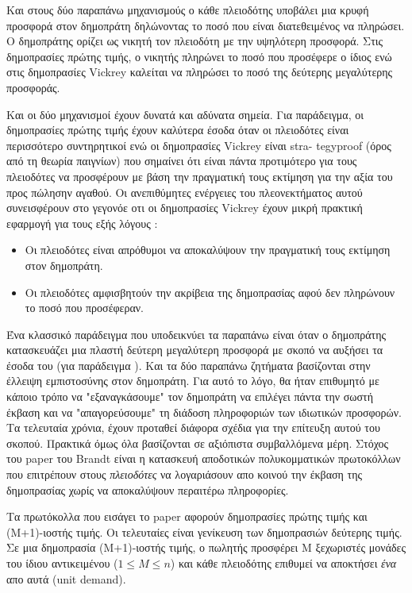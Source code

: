 \documentclass[a4paper,11pt]{article}
\begin{document}
Και στους δύο παραπάνω μηχανισμούς ο κάθε πλειοδότης υποβάλει μια κρυφή προσφορά στον δημοπράτη δηλώνοντας το
ποσό που είναι διατεθειμένος να πληρώσει. Ο δημοπράτης ορίζει ως νικητή τον πλειοδότη με την υψηλότερη
προσφορά. Στις δημοπρασίες πρώτης τιμής, ο νικητής πληρώνει το ποσό που προσέφερε ο ίδιος ενώ στις δημοπρασίες
Vickrey καλείται να πληρώσει το ποσό της δεύτερης μεγαλύτερης προσφοράς.

Και οι δύο μηχανισμοί έχουν δυνατά και αδύνατα σημεία. Για παράδειγμα, οι δημοπρασίες πρώτης τιμής έχουν
καλύτερα έσοδα όταν οι πλειοδότες είναι περισσότερο συντηρητικοί ενώ οι δημοπρασίες Vickrey είναι
stra- tegyproof (όρος από τη θεωρία παιγνίων) που σημαίνει ότι είναι πάντα προτιμότερο για τους πλειοδότες να
προσφέρουν με βάση την πραγματική τους εκτίμηση για την αξία του προς πώλησην αγαθού. Οι ανεπιθύμητες
ενέργειες του πλεονεκτήματος αυτού συνεισφέρουν στο γεγονόε οτι οι δημοπρασίες Vickrey έχουν μικρή πρακτική
εφαρμογή για τους εξής λόγους \cite{RH, RTK, Sandholm}:

\begin{itemize}
	\item Οι πλειοδότες είναι απρόθυμοι να αποκαλύψουν την πραγματική τους εκτίμηση στον δημοπράτη. 
	\item Οι πλειοδότες αμφισβητούν την ακρίβεια της δημοπρασίας αφού δεν πληρώνουν το ποσό που προσέφεραν.
\end{itemize}

Ένα κλασσικό παράδειγμα που υποδεικνύει τα παραπάνω είναι όταν ο δημοπράτης κατασκευάζει μια πλαστή δεύτερη
μεγαλύτερη προσφορά με σκοπό να αυξήσει τα έσοδα του (για παράδειγμα \cite{PS}). Και τα δύο παραπάνω ζητήματα βασίζονται στην έλλειψη
εμπιστοσύνης στον δημοπράτη. Για αυτό το λόγο, θα ήταν επιθυμητό με κάποιο τρόπο να "εξαναγκάσουμε" τον
δημοπράτη να επιλέγει πάντα την σωστή έκβαση και να "απαγορεύσουμε" τη διάδοση πληροφοριών των ιδιωτικών
προσφορών. Τα τελευταία χρόνια, έχουν προταθεί διάφορα σχέδια για την επίτευξη αυτού του σκοπού. Πρακτικά όμως
όλα βασίζονται σε αξιόπιστα συμβαλλόμενα μέρη. Στόχος του paper του Brandt είναι η κατασκευή αποδοτικών
πολυκομματικών πρωτοκόλλων που επιτρέπουν στους \emph{πλειοδότες} να λογαριάσουν απο κοινού την έκβαση της
δημοπρασίας χωρίς να αποκαλύψουν περαιτέρω πληροφορίες.

Τα πρωτόκολλα που εισάγει το paper αφορούν δημοπρασίες πρώτης τιμής και (Μ+1)-ιοστής τιμής. Οι τελευταίες
είναι γενίκευση των δημοπρασιών δεύτερης τιμής. Σε μια δημοπρασία (Μ+1)-ιοστής τιμής, ο πωλητής προσφέρει Μ ξεχωριστές μονάδες
του ίδιου αντικειμένου ($1 \leq M \leq n$) και κάθε πλειοδότης επιθυμεί να αποκτήσει \emph{ένα} απο αυτά (unit demand). 
\end{document}
